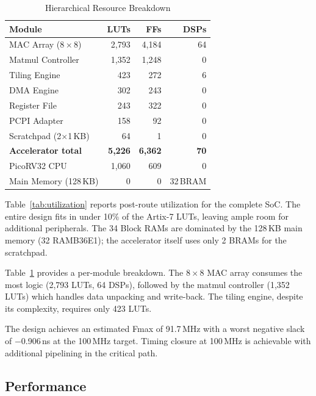 \documentclass[conference]{IEEEtran}
\begin{document}
\begin{table}[t]
\centering
\caption{Hierarchical Resource Breakdown}
\label{tab:hier}
\begin{tabular}{@{}lrrr@{}}
\toprule
\textbf{Module} & \textbf{LUTs} & \textbf{FFs} & \textbf{DSPs} \\
\midrule
MAC Array ($8\times8$) & 2{,}793 & 4{,}184 & 64 \\
Matmul Controller      & 1{,}352 & 1{,}248 &  0 \\
Tiling Engine          &     423 &     272 &  6 \\
DMA Engine             &     302 &     243 &  0 \\
Register File          &     243 &     322 &  0 \\
PCPI Adapter           &     158 &      92 &  0 \\
Scratchpad (2$\times$1\,KB) &  64 &       1 &  0 \\
\midrule
\textbf{Accelerator total} & \textbf{5{,}226} & \textbf{6{,}362} & \textbf{70} \\
PicoRV32 CPU           & 1{,}060 &     609 &  0 \\
Main Memory (128\,KB)  &       0 &       0 & 32\,BRAM \\
\bottomrule
\end{tabular}
\end{table}

Table~\ref{tab:utilization} reports post-route utilization for the complete SoC. The entire design fits in under 10\% of the Artix-7 LUTs, leaving ample room for additional peripherals. The 34 Block RAMs are dominated by the 128\,KB main memory (32 RAMB36E1); the accelerator itself uses only 2 BRAMs for the scratchpad.

Table~\ref{tab:hier} provides a per-module breakdown. The $8\times8$ MAC array consumes the most logic (2{,}793 LUTs, 64 DSPs), followed by the matmul controller (1{,}352 LUTs) which handles data unpacking and write-back. The tiling engine, despite its complexity, requires only 423 LUTs.

The design achieves an estimated Fmax of 91.7\,MHz with a worst negative slack of $-$0.906\,ns at the 100\,MHz target. Timing closure at 100\,MHz is achievable with additional pipelining in the critical path.

\subsection{Performance}
\end{document}
